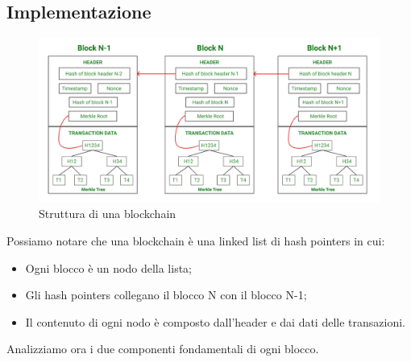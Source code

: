 \documentclass[12pt]{report}
\begin{document}
\subsection{Implementazione}
\begin{figure}[H]
    \centering
    \includegraphics[width=1.1\textwidth]{Blockchain.png}
    \captionsetup{justification=centering}
    \caption{Struttura di una blockchain \cite{Due}}
    \label{fig:blockchain}
\end{figure}
\noindent
Possiamo notare che una blockchain è una linked list di hash pointers in cui:
\begin{itemize}[topsep=5pt, itemsep=0pt]
    \item Ogni blocco è un nodo della lista;
    \item Gli hash pointers collegano il blocco N con il blocco N-1;
    \item Il contenuto di ogni nodo è composto dall'header e dai dati delle transazioni.
\end{itemize}
Analizziamo ora i due componenti fondamentali di ogni blocco.
\end{document}

